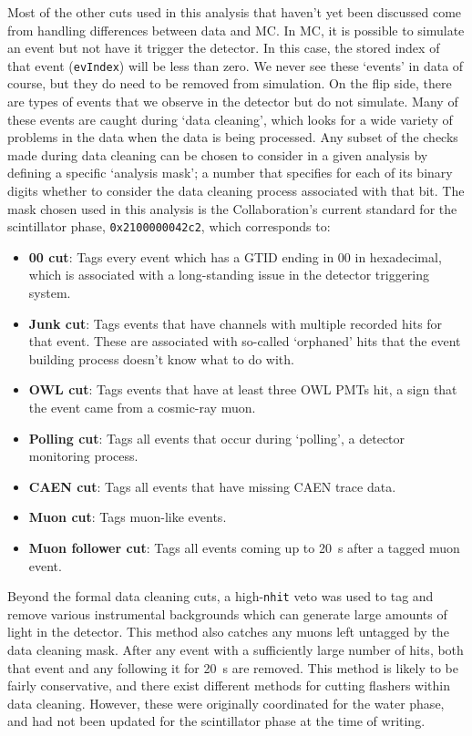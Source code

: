Most of the other cuts used in this analysis that haven't yet been discussed come from handling differences between data and MC. In MC, it is possible to simulate an event but not have it trigger the detector. In this case, the stored index of that event (\texttt{evIndex}) will be less than zero. We never see these `events' in data of course, but they do need to be removed from simulation. On the flip side, there are types of events that we observe in the detector but do not simulate. Many of these events are caught during `data cleaning', which looks for a wide variety of problems in the data when the data is being processed. Any subset of the checks made during data cleaning can be chosen to consider in a given analysis by defining a specific `analysis mask'; a number that specifies for each of its binary digits whether to consider the data cleaning process associated with that bit. The mask chosen used in this analysis is the Collaboration's current standard for the scintillator phase, \texttt{0x2100000042c2}, which corresponds to:

\begin{itemize}
    \item \textbf{00 cut}: Tags every event which has a GTID ending in 00 in hexadecimal, which is associated with a long-standing issue in the detector triggering system.
    \item \textbf{Junk cut}: Tags events that have channels with multiple recorded hits for that event. These are associated with so-called `orphaned' hits that the event building process doesn't know what to do with.
    \item \textbf{OWL cut}: Tags events that have at least three OWL PMTs hit, a sign that the event came from a cosmic-ray muon.
    \item \textbf{Polling cut}: Tags all events that occur during `polling', a detector monitoring process.
    \item \textbf{CAEN cut}: Tags all events that have missing CAEN trace data.
    \item \textbf{Muon cut}: Tags muon-like events.
    \item \textbf{Muon follower cut}: Tags all events coming up to \SI{20}{\second} after a tagged muon event.
\end{itemize}

Beyond the formal data cleaning cuts, a high-\texttt{nhit} veto was used to tag and remove various instrumental backgrounds which can generate large amounts of light in the detector. This method also catches any muons left untagged by the data cleaning mask. After any event with a sufficiently large number of hits, both that event and any following it for \SI{20}{\second} are removed. This method is likely to be fairly conservative, and there exist different methods for cutting flashers within data cleaning. However, these were originally coordinated for the water phase, and had not been updated for the scintillator phase at the time of writing.

